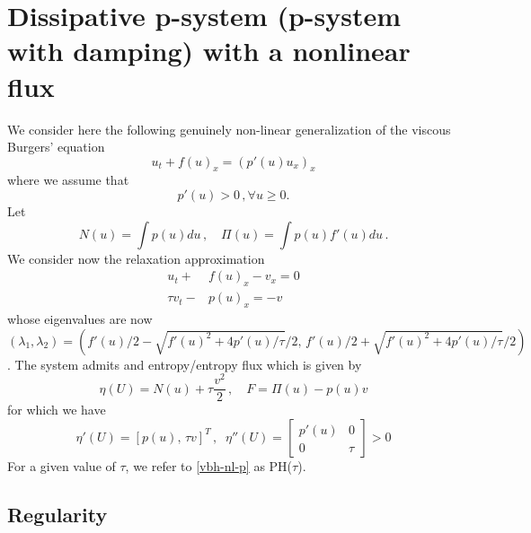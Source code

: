 \documentclass{article}
\theoremstyle{plain}
\theoremstyle{definition}
\numberwithin{theorem}{section}
\begin{document}
\section{Dissipative p-system (p-system with damping) with a nonlinear flux}

We consider here the following genuinely non-linear generalization of the viscous Burgers' equation
\begin{equation}\label{vbh-nl}
u_t + f(u)_x =  (p'(u) u_x)_x
\end{equation}
where we assume that 
\begin{equation}\label{vbh-nl-p}
p'(u) >0\,, \forall u\ge 0.
\end{equation}
Let 
\begin{equation}\label{vbh-nl1}
N(u) = \int p(u)  du\,,\quad
\Pi(u) = \int p(u)f'(u) du\,. 
\end{equation}
We consider now the relaxation approximation 
\begin{equation}\label{psys-nl1}
\begin{aligned}
u_t + &  f(u)_x - v_x =0\\
\tau v_t -& p(u)_x = -v
\end{aligned}
\end{equation}
whose eigenvalues are now $(\lambda_1,\lambda_2)=(f'(u)/2 - \sqrt{f'(u)^2  + 4 p'(u)/\tau}/2,\,f'(u)/2 + \sqrt{f'(u)^2  + 4 p'(u)/\tau}/2)$.
The system admits and entropy/entropy flux which is given by
$$
\eta(U) = N(u) +  \tau\dfrac{v^2}{2}\,,\quad
F = \Pi(u) - p(u)v
$$
for which we have 
$$
\eta'(U) =  [p(u),\,  \tau v]^T\,,\;\; \eta''(U) = \left[\begin{array}{cc}
p'(u)&  0\\
0 & \tau
\end{array}
\right]>0
$$
For a given value of $\tau$, we refer to \eqref{vbh-nl-p} as PH($\tau$).

\subsection{Regularity}
\end{document}
